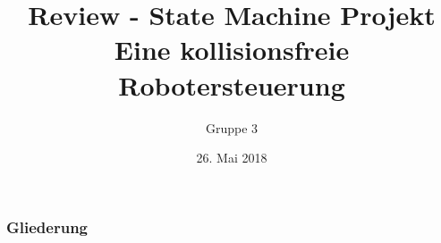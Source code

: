 \documentclass{beamer}
\begin{document}
			
	
	\title[Review - State Machine Projekt]{Review - State Machine Projekt\\ Eine kollisionsfreie Robotersteuerung}
	\author{Gruppe 3}
	
	 \begin{frame}[title=Hauptgebaeude_Nacht.jpg]
	 	\maketitle
	 	\date{26. Mai 2018}
 	\end{frame}
	 
	\begin{frame}
		\frametitle{Gliederung}
		\tableofcontents
	\end{frame}
\end{document}

